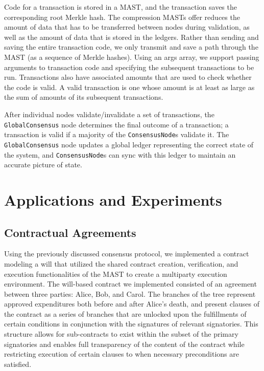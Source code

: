 \documentclass{vldb}
\begin{document}
Code for a transaction is stored in a MAST, and the transaction saves the corresponding root Merkle hash. The compression MASTs offer reduces the amount of data that has to be transferred between nodes during validation, as well as the amount of data that is stored in the ledgers. Rather than sending and saving the entire transaction code, we only transmit and save a path through the MAST (as a sequence of Merkle hashes). Using an args array, we support passing arguments to transaction code and specifying the subsequent transactions to be run. Transactions also have associated amounts that are used to check whether the code is valid. A valid transaction is one whose amount is at least as large as the sum of amounts of its subsequent transactions.

After individual nodes validate/invalidate a set of transactions, the \texttt{GlobalConsensus} node determines the final outcome of a transaction; a transaction is valid if a majority of the \texttt{ConsensusNode}s validate it. The \texttt{GlobalConsensus} node updates a global ledger representing the correct state of the system, and \texttt{ConsensusNode}s can sync with this ledger to maintain an accurate picture of state.

\section{Applications and Experiments}

\subsection{Contractual Agreements}

Using the previously discussed consensus protocol, we implemented a contract modeling a will that utilized the shared contract creation, verification, and execution functionalities of the MAST to create a multiparty execution environment. The will-based contract we implemented consisted of an agreement between three parties: Alice, Bob, and Carol. The branches of the tree represent approved expenditures both before and after Alice’s death, and present clauses of the contract as a series of branches that are unlocked upon the fulfillments of certain conditions in conjunction with the signatures of relevant signatories. This structure allows for sub-contracts to exist within the subset of the primary signatories and enables full transparency of the content of the contract while restricting execution of certain clauses to when necessary preconditions are satisfied.
\end{document}

